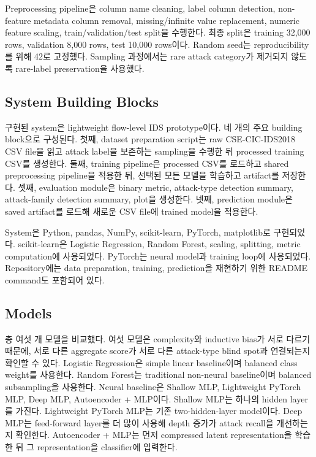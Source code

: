 \documentclass[sigconf,nonacm]{acmart}
\begin{document}
Preprocessing pipeline은 column name cleaning, label column detection, non-feature metadata column removal, missing/infinite value replacement, numeric feature scaling, train/validation/test split을 수행한다.
최종 split은 training 32,000 rows, validation 8,000 rows, test 10,000 rows이다.
Random seed는 reproducibility를 위해 42로 고정했다.
Sampling 과정에서는 rare attack category가 제거되지 않도록 rare-label preservation을 사용했다.

\subsection{System Building Blocks}

구현된 system은 lightweight flow-level IDS prototype이다.
네 개의 주요 building block으로 구성된다.
첫째, dataset preparation script는 raw CSE-CIC-IDS2018 CSV file을 읽고 attack label을 보존하는 sampling을 수행한 뒤 processed training CSV를 생성한다.
둘째, training pipeline은 processed CSV를 로드하고 shared preprocessing pipeline을 적용한 뒤, 선택된 모든 모델을 학습하고 artifact를 저장한다.
셋째, evaluation module은 binary metric, attack-type detection summary, attack-family detection summary, plot을 생성한다.
넷째, prediction module은 saved artifact를 로드해 새로운 CSV file에 trained model을 적용한다.

System은 Python, pandas, NumPy, scikit-learn, PyTorch, matplotlib로 구현되었다.
scikit-learn은 Logistic Regression, Random Forest, scaling, splitting, metric computation에 사용되었다.
PyTorch는 neural model과 training loop에 사용되었다.
Repository에는 data preparation, training, prediction을 재현하기 위한 README command도 포함되어 있다.

\subsection{Models}

총 여섯 개 모델을 비교했다.
여섯 모델은 complexity와 inductive bias가 서로 다르기 때문에, 서로 다른 aggregate score가 서로 다른 attack-type blind spot과 연결되는지 확인할 수 있다.
Logistic Regression은 simple linear baseline이며 balanced class weight를 사용한다.
Random Forest는 traditional non-neural baseline이며 balanced subsampling을 사용한다.
Neural baseline은 Shallow MLP, Lightweight PyTorch MLP, Deep MLP, Autoencoder + MLP이다.
Shallow MLP는 하나의 hidden layer를 가진다.
Lightweight PyTorch MLP는 기존 two-hidden-layer model이다.
Deep MLP는 feed-forward layer를 더 많이 사용해 depth 증가가 attack recall을 개선하는지 확인한다.
Autoencoder + MLP는 먼저 compressed latent representation을 학습한 뒤 그 representation을 classifier에 입력한다.
\end{document}
